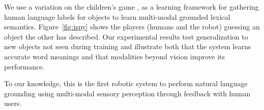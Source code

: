 We use a variation on the children's game \ispy, as a learning framework for gathering human language labels for objects to learn multi-modal grounded lexical semantics.
Figure~\ref{fig:ispy} shows the players (humans and the robot) guessing an object the other has described.
Our experimental results test generalization to new objects not seen during training and illustrate both that the system learns accurate word meanings and that modalities beyond vision improve its performance.

To our knowledge, this is the first robotic system to perform natural language grounding using multi-modal sensory perception through feedback with human users.